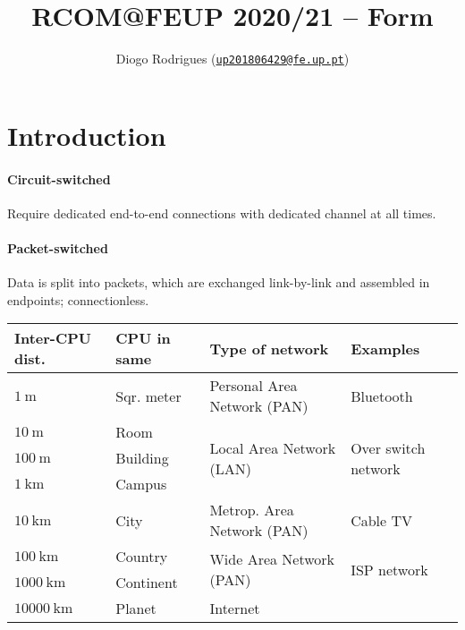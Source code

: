 \documentclass{form}
\author{Diogo Rodrigues (\texttt{\href{mailto:up201806429@fe.up.pt}{up201806429@fe.up.pt}})}
\title{RCOM@FEUP 2020/21 -- Form}
\begin{document}

\maketitle

\begin{minipage}{0.425\textwidth}
    \section*{Introduction}
    \paragraph{Circuit-switched} Require dedicated end-to-end connections with dedicated channel at all times.
    \paragraph{Packet-switched} Data is split into packets, which are exchanged link-by-link and assembled in endpoints; connectionless.
\end{minipage}
\begin{minipage}{38em}
    \begin{tabular}{@{}l | l | l | p{5.4em}@{}}
        \textbf{Inter-CPU dist.} & \textbf{CPU in same} & \textbf{Type of network} & \textbf{Examples} \\ \hline
        $\SI{    1}{     \meter}$ & Sqr. meter   & Personal Area Network (PAN)               & Bluetooth \\ \hline
        $\SI{   10}{     \meter}$ & Room         & \multirow{3}{*}{Local Area Network (LAN)} & \multirow{3}{5.4em}{Over switch network} \\ \cline{1-2}
        $\SI{  100}{     \meter}$ & Building     &                                           & \\ \cline{1-2}
        $\SI{    1}{\kilo\meter}$ & Campus       &                                           & \\ \hline
        $\SI{   10}{\kilo\meter}$ & City         & Metrop. Area Network (PAN)                & Cable TV \\ \hline
        $\SI{  100}{\kilo\meter}$ & Country      & \multirow{2}{*}{Wide Area Network (PAN)}  & \multirow{2}{5.4em}{ISP network} \\ \cline{1-2}
        $\SI{ 1000}{\kilo\meter}$ & Continent    &                                           & \\ \hline
        $\SI{10000}{\kilo\meter}$ & Planet       & Internet                                  & \\
    \end{tabular}
\end{minipage}
\end{document}
